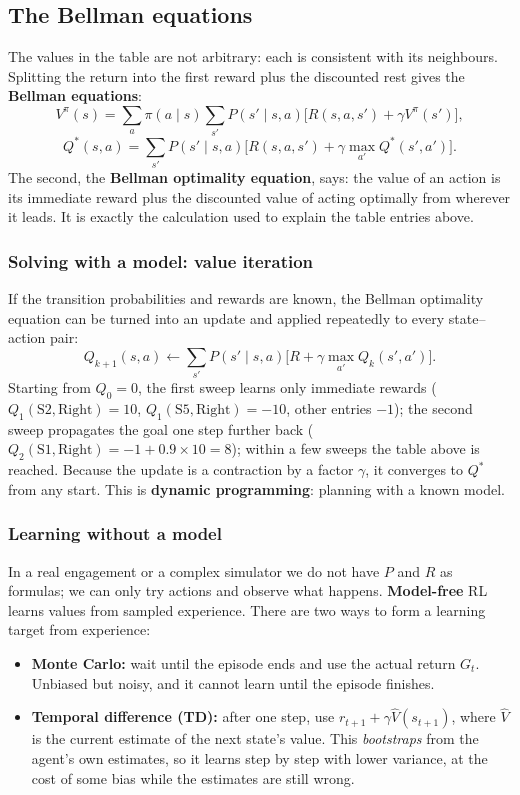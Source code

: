 \documentclass[11pt]{article}
\begin{document}
\subsection{The Bellman equations}
The values in the table are not arbitrary: each is consistent with its neighbours. Splitting the return into the first reward plus the discounted rest gives the \textbf{Bellman equations}:
\[V^\pi(s)=\sum_a\pi(a\mid s)\sum_{s'}P(s'\mid s,a)\big[R(s,a,s')+\gamma V^\pi(s')\big],\]
\[Q^*(s,a)=\sum_{s'}P(s'\mid s,a)\Big[R(s,a,s')+\gamma\max_{a'}Q^*(s',a')\Big].\]
The second, the \textbf{Bellman optimality equation}, says: the value of an action is its immediate reward plus the discounted value of acting optimally from wherever it leads. It is exactly the calculation used to explain the table entries above.

\subsubsection{Solving with a model: value iteration}
If the transition probabilities and rewards are known, the Bellman optimality equation can be turned into an update and applied repeatedly to every state--action pair:
\[Q_{k+1}(s,a)\leftarrow\sum_{s'}P(s'\mid s,a)\big[R+\gamma\max_{a'}Q_k(s',a')\big].\]
Starting from $Q_0=0$, the first sweep learns only immediate rewards ($Q_1(\text{S2},\text{Right})=10$, $Q_1(\text{S5},\text{Right})=-10$, other entries $-1$); the second sweep propagates the goal one step further back ($Q_2(\text{S1},\text{Right})=-1+0.9\times10=8$); within a few sweeps the table above is reached. Because the update is a contraction by a factor $\gamma$, it converges to $Q^*$ from any start. This is \textbf{dynamic programming}: planning with a known model.

\subsubsection{Learning without a model}
In a real engagement or a complex simulator we do not have $P$ and $R$ as formulas; we can only try actions and observe what happens. \textbf{Model-free} RL learns values from sampled experience. There are two ways to form a learning target from experience:
\begin{itemize}
\item \textbf{Monte Carlo:} wait until the episode ends and use the actual return $G_t$. Unbiased but noisy, and it cannot learn until the episode finishes.
\item \textbf{Temporal difference (TD):} after one step, use $r_{t+1}+\gamma\hat V(s_{t+1})$, where $\hat V$ is the current estimate of the next state's value. This \emph{bootstraps} from the agent's own estimates, so it learns step by step with lower variance, at the cost of some bias while the estimates are still wrong.
\end{itemize}
\end{document}
